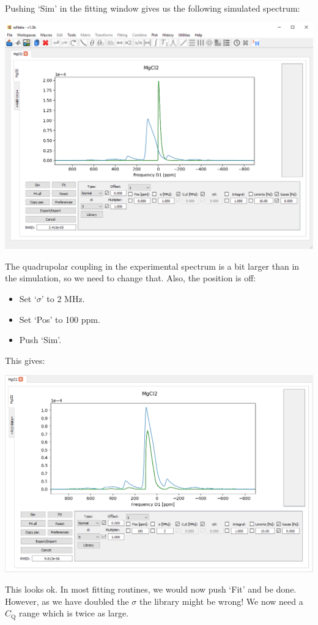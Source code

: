 \documentclass[11pt,a4paper]{article}
\begin{document}
Pushing `Sim' in the fitting window gives us the following simulated spectrum:
\begin{center}
\includegraphics[width=0.8\linewidth]{Figs/fig4.PNG}
\end{center}

The quadrupolar coupling in the experimental spectrum is a bit larger than in the simulation, so we need to change that. Also, the position is off:
\begin{itemize}
  \item Set `$\sigma$' to 2 MHz.
  \item Set `Pos' to 100 ppm.
  \item Push `Sim'.
\end{itemize}
This gives:
\begin{center}
\includegraphics[width=0.8\linewidth]{Figs/fig5.PNG}
\end{center}
This looks ok. In most fitting routines, we would now push `Fit' and be done. However, as we have doubled the $\sigma$ the library might be wrong! We now need a $C_\text{Q}$ range which is twice as large.
\end{document}
